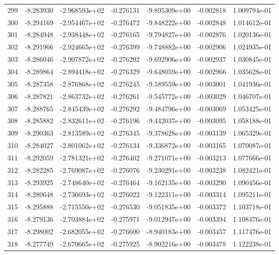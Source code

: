 \begin{tabular}{rrrrrrr}
 299 &  -8.283930 & -2.968593e+02 & -0.276131 & -9.895309e+00 &  -0.002818 &  1.009794e-01 \\
 300 &  -8.294169 & -2.954467e+02 & -0.276472 & -9.848222e+00 &  -0.002848 &  1.014612e-01 \\
 301 &  -8.284948 & -2.938448e+02 & -0.276165 & -9.794827e+00 &  -0.002876 &  1.020136e-01 \\
 302 &  -8.291966 & -2.924665e+02 & -0.276399 & -9.748882e+00 &  -0.002906 &  1.024935e-01 \\
 303 &  -8.286046 & -2.907872e+02 & -0.276202 & -9.692906e+00 &  -0.002937 &  1.030845e-01 \\
 304 &  -8.289864 & -2.894418e+02 & -0.276329 & -9.648059e+00 &  -0.002966 &  1.035628e-01 \\
 305 &  -8.287358 & -2.876868e+02 & -0.276245 & -9.589559e+00 &  -0.003001 &  1.041936e-01 \\
 306 &  -8.287821 & -2.863732e+02 & -0.276261 & -9.545772e+00 &  -0.003029 &  1.046707e-01 \\
 307 &  -8.288765 & -2.845439e+02 & -0.276292 & -9.484796e+00 &  -0.003069 &  1.053425e-01 \\
 308 &  -8.285882 & -2.832611e+02 & -0.276196 & -9.442037e+00 &  -0.003095 &  1.058188e-01 \\
 309 &  -8.290363 & -2.813589e+02 & -0.276345 & -9.378628e+00 &  -0.003139 &  1.065329e-01 \\
 310 &  -8.284027 & -2.801062e+02 & -0.276134 & -9.336872e+00 &  -0.003165 &  1.070087e-01 \\
 311 &  -8.292059 & -2.781321e+02 & -0.276402 & -9.271071e+00 &  -0.003213 &  1.077666e-01 \\
 312 &  -8.282285 & -2.769087e+02 & -0.276076 & -9.230291e+00 &  -0.003238 &  1.082421e-01 \\
 313 &  -8.293925 & -2.748640e+02 & -0.276464 & -9.162135e+00 &  -0.003290 &  1.090456e-01 \\
 314 &  -8.280648 & -2.736693e+02 & -0.276022 & -9.122311e+00 &  -0.003314 &  1.095211e-01 \\
 315 &  -8.295888 & -2.715550e+02 & -0.276530 & -9.051835e+00 &  -0.003372 &  1.103718e-01 \\
 316 &  -8.279136 & -2.703884e+02 & -0.275971 & -9.012947e+00 &  -0.003394 &  1.108476e-01 \\
 317 &  -8.298002 & -2.682055e+02 & -0.276600 & -8.940183e+00 &  -0.003457 &  1.117476e-01 \\
 318 &  -8.277749 & -2.670665e+02 & -0.275925 & -8.902216e+00 &  -0.003478 &  1.122238e-01 \\

\end{tabular}
